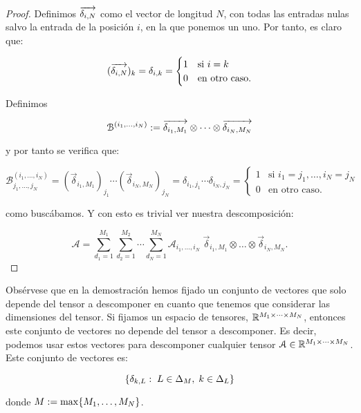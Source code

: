 \begin{proof}
	Definimos $\overrightarrow{\delta_{i, N}}$ como el vector de longitud $N$, con todas las entradas nulas salvo la entrada de la posición $i$, en la que ponemos un uno. Por tanto, es claro que:

	\begin{equation}
		(\overrightarrow{\delta_{i, N}})_k =  \delta_{i, k} =
		\begin{cases}
			1 & \text{si } i = k    \\
			0 & \text{en otro caso}.
		\end{cases}
	\end{equation}

	Definimos

	\begin{equation}
		\mathcal{B}^{(i_1, \ldots, i_N)} := \overrightarrow{\delta_{i_1, M_1}} \otimes \cdots \otimes \overrightarrow{\delta_{i_N, M_N}}
	\end{equation}

	y por tanto se verifica que:

	\begin{equation}
		\mathcal{B}^{(i_1, \ldots, i_N)}_{j_1, \ldots, j_N} = (\vec{\delta}_{i_1, M_1})_{j_1} \cdots (\vec{\delta}_{i_N, M_N})_{j_N} = \delta_{i_1, j_1} \cdots \delta_{i_N, j_N} =
		\begin{cases}
			1 & \text{si } i_1 = j_1, \ldots, i_N = j_N \\
			0 & \text{en otro caso}.
		\end{cases}
	\end{equation}

	como buscábamos. Y con esto es trivial ver nuestra descomposición:

	\begin{equation}
		\mathcal{A} = \sum_{d_1 = 1}^{M_1} \sum_{d_2 = 1}^{M_2} \cdots \sum_{d_N = 1}^{M_N} \mathcal{A}_{i_1, \ldots, i_N} \; \vec{\delta}_{i_1, M_1} \otimes \ldots \otimes \vec{\delta}_{i_N, M_N}.
	\end{equation}
\end{proof}



\begin{observacion} \label{observacion:descomposicion_cp_conjunta}

	Obsérvese que en la demostración hemos fijado un conjunto de vectores que solo depende del tensor a descomponer en cuanto que tenemos que considerar las dimensiones del tensor. Si fijamos un espacio de tensores, $\mathbb{R}^{M_1 \times \cdots \times M_N}$, entonces este conjunto de vectores no depende del tensor a descomponer. Es decir, podemos usar estos vectores para descomponer cualquier tensor $\mathcal{A} \in \mathbb{R}^{M_1 \times \cdots \times M_N}$. Este conjunto de vectores es:

	\begin{equation}
		\{ \delta_{k, L}: \; L \in \Delta_{M}, \; k \in \Delta_{L} \}
	\end{equation}

	donde $M := \max \{ M_1, \ldots, M_N \}$.

\end{observacion}

